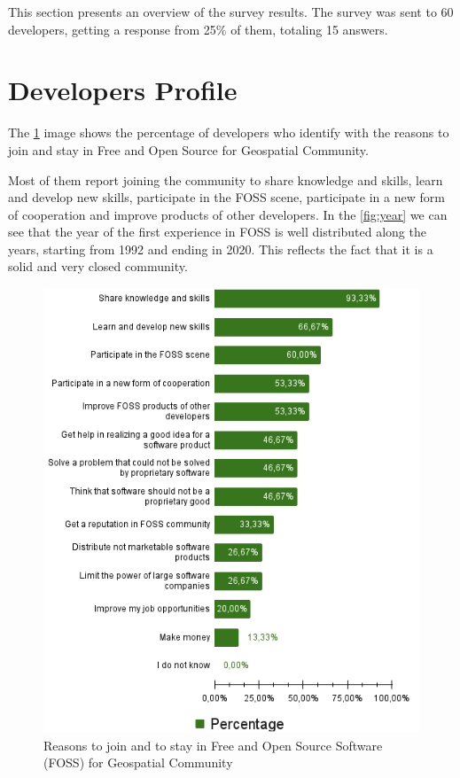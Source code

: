 This section presents an overview of the survey results. The survey was sent to 60 developers, getting a response from 25\% of them, totaling 15 answers.

\section{Developers Profile}

The \ref{fig:reasons} image shows the percentage of developers who identify with the reasons to join and stay in Free and Open Source for Geospatial Community.

 Most of them report joining the community to share knowledge and skills, learn and develop new skills, participate in the FOSS scene, participate in a new form of cooperation and improve products of other developers. In the \ref{fig:year} we can see that the year of the first experience in FOSS is well distributed along the years, starting from 1992 and ending in 2020. This reflects the fact that it is a solid and very closed community.

\begin{figure}[]
     \centering
     \includegraphics[scale=0.7]{img/reaons.png}
     \caption{Reasons to join and to stay in Free and Open Source Software (FOSS) for Geospatial Community}
     \label{fig:reasons}
\end{figure}
 
